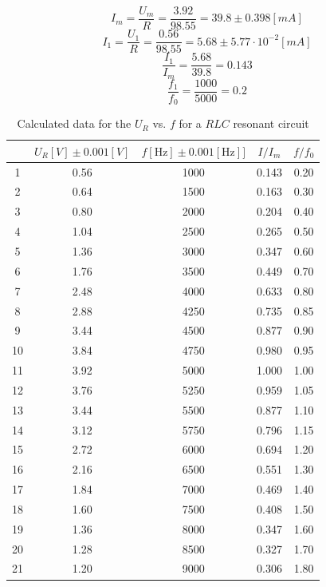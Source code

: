 \documentclass[12pt]{article}
\begin{document}
$$I_m=\frac{U_m}{R}=\frac{3.92}{98.55}=39.8\pm0.398[mA]$$
$$I_1=\frac{U_1}{R}=\frac{0.56}{98.55}=5.68\pm5.77\cdot10^{-2}[mA]$$
$$\frac{I_1}{I_m}=\frac{5.68}{39.8}=0.143$$
$$\frac{f_1}{f_0}=\frac{1000}{5000}=0.2$$
\begin{table}[H]
\centering
\begin{tabular}{|c|c|c|c|c|}
\hline
   &$U_R[V]\pm0.001[V]$  & $f[\mathrm{Hz}]\pm0.001[\mathrm{Hz}]]$  &$I/I_m$&$f/f_0$       \\ \hline
1  & 0.56      & 1000&0.143&0.20       \\ \hline
2  & 0.64      & 1500&0.163&0.30       \\ \hline
3  & 0.80      & 2000&0.204&0.40       \\ \hline
4  & 1.04      & 2500&0.265&0.50       \\ \hline
5  & 1.36      & 3000&0.347&0.60       \\ \hline
6  & 1.76      & 3500&0.449&0.70       \\ \hline
7  & 2.48      & 4000&0.633&0.80       \\ \hline
8  & 2.88      & 4250&0.735&0.85       \\ \hline
9  & 3.44      & 4500&0.877&0.90       \\ \hline
10 & 3.84      & 4750&0.980&0.95       \\ \hline
11 & 3.92      & 5000&1.000&1.00       \\ \hline
12 & 3.76      & 5250&0.959&1.05       \\ \hline
13 & 3.44      & 5500&0.877&1.10       \\ \hline
14 & 3.12      & 5750&0.796&1.15       \\ \hline
15 & 2.72      & 6000&0.694&1.20       \\ \hline
16 & 2.16      & 6500&0.551&1.30       \\ \hline
17 & 1.84      & 7000&0.469&1.40       \\ \hline
18 & 1.60      & 7500&0.408&1.50       \\ \hline
19 & 1.36      & 8000&0.347&1.60       \\ \hline
20 & 1.28      & 8500&0.327&1.70       \\ \hline
21 & 1.20      & 9000&0.306&1.80       \\ \hline
\end{tabular}
\caption{Calculated data for the $U_R$ vs. $f$ for a $RLC$ resonant circuit}
\end{table}
\end{document}
